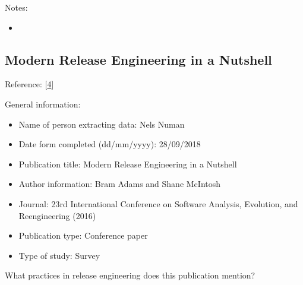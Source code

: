 \documentclass[]{book}
\providecommand{\tightlist}{%
  \setlength{\itemsep}{0pt}\setlength{\parskip}{0pt}}
\begin{document}
Notes:

\begin{itemize}
\item
\end{itemize}

\subsection{Modern Release Engineering in a
Nutshell}\label{modern-release-engineering-in-a-nutshell}

Reference: {[}\protect\hyperlink{ref-adams2016a}{4}{]}

General information:

\begin{itemize}
\tightlist
\item
  Name of person extracting data: Nels Numan
\item
  Date form completed (dd/mm/yyyy): 28/09/2018
\item
  Publication title: Modern Release Engineering in a Nutshell
\item
  Author information: Bram Adams and Shane McIntosh
\item
  Journal: 23rd International Conference on Software Analysis,
  Evolution, and Reengineering (2016)
\item
  Publication type: Conference paper
\item
  Type of study: Survey
\end{itemize}

What practices in release engineering does this publication mention?
\end{document}
